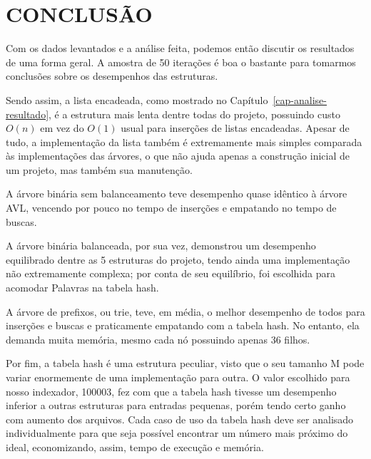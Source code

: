 \chapter*{CONCLUSÃO}\label{cap-conclusao}

Com os dados levantados e a análise feita, podemos então discutir os resultados de uma forma geral. A amostra de 50 iterações é boa o bastante para tomarmos conclusões sobre os desempenhos das estruturas.

Sendo assim, a lista encadeada, como mostrado no Capítulo~\ref{cap-analise-resultado}, é a estrutura mais lenta dentre todas do projeto, possuindo custo $O(n)$ em vez do $O(1)$ usual para inserções de listas encadeadas. Apesar de tudo, a implementação da lista também é extremamente mais simples comparada às implementações das árvores, o que não ajuda apenas a construção inicial de um projeto, mas também sua manutenção.

A árvore binária sem balanceamento teve desempenho quase idêntico à árvore AVL, vencendo por pouco no tempo de inserções e empatando no tempo de buscas.

A árvore binária balanceada, por sua vez, demonstrou um desempenho equilibrado dentre as 5 estruturas do projeto, tendo ainda uma implementação não extremamente complexa; por conta de seu equilíbrio, foi escolhida para acomodar Palavras na tabela hash.

A árvore de prefixos, ou trie, teve, em média, o melhor desempenho de todos para inserções e buscas e praticamente empatando com a tabela hash. No entanto, ela demanda muita memória, mesmo cada nó possuindo apenas 36 filhos.

Por fim, a tabela hash é uma estrutura peculiar, visto que o seu tamanho M pode variar enormemente de uma implementação para outra. O valor escolhido para nosso indexador, 100003, fez com que a tabela hash tivesse um desempenho inferior a outras estruturas para entradas pequenas, porém tendo certo ganho com aumento dos arquivos. Cada caso de uso da tabela hash deve ser analisado individualmente para que seja possível encontrar um número mais próximo do ideal, economizando, assim, tempo de execução e memória.

